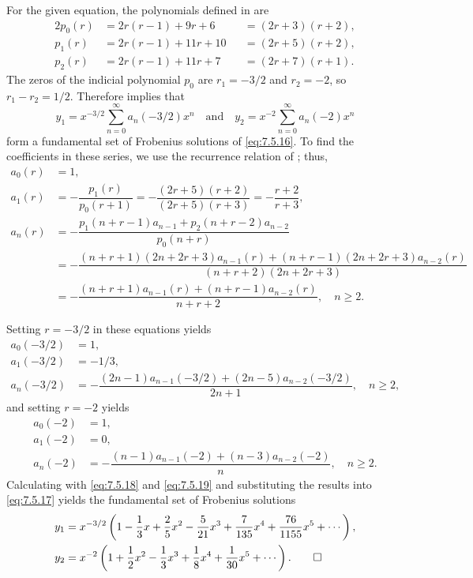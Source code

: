 \begin{solution}
For  the given equation, the polynomials defined in
 are
\begin{alignat*}{2}
p_0(r)&=2r(r-1)+9r+6&&=(2r+3)(r+2),\\
p_1(r)&=2r(r-1)+11r+10&&=(2r+5)(r+2),\\
p_2(r)&=2r(r-1)+11r+7&&=(2r+7)(r+1).
\end{alignat*}
The zeros of the indicial polynomial $p_0$ are $r_1=-3/2$
and $r_2=-2$, so  $r_1-r_2=1/2$. Therefore
 implies that
\begin{equation} \label{eq:7.5.17}
y_1=x^{-3/2}\sum_{n=0}^\infty a_n(-3/2)x^n\quad\text{and}\quad
y_2=x^{-2}\sum_{n=0}^\infty a_n(-2)x^n
\end{equation}
form a fundamental set of Frobenius
solutions
of \eqref{eq:7.5.16}.
To find the coefficients in these series, we use the recurrence
relation of ;   thus,
\begin{align*}
a_0(r)&=1,\\
a_1(r)&=-\dfrac{p_1(r)}{p_0(r+1)}
=-\dfrac{(2r+5)(r+2)}{(2r+5)(r+3)}
=-\dfrac{r+2}{r+3},\\
a_n(r)&=-\dfrac{p_1(n+r-1)a_{n-1}+p_2(n+r-2)a_{n-2}}{p_0(n+r)}\\
&=-\dfrac{(n+r+1)(2n+2r+3)a_{n-1}(r)
+(n+r-1)(2n+2r+3)a_{n-2}(r)}{(n+r+2)(2n+2r+3)}\\
&=-\dfrac{(n+r+1)a_{n-1}(r)+(n+r-1)a_{n-2}(r)}{n+r+2},\quad n\ge2.
\end{align*}

Setting $r=-3/2$ in these equations yields
\begin{equation} \label{eq:7.5.18}
\begin{aligned}
a_0(-3/2)&=1,\\
a_1(-3/2)&=-1/3,\\
a_n(-3/2)&=-\dfrac{(2n-1)a_{n-1}(-3/2)+
(2n-5)a_{n-2}(-3/2)}{2n+1},\quad n\ge2,
\end{aligned}
\end{equation}
and setting $r=-2$ yields
\begin{equation} \label{eq:7.5.19}
\begin{aligned}
a_0(-2)&=1,\\
a_1(-2)&=0,\\
a_n(-2)&=-\dfrac{(n-1)a_{n-1}(-2)+(n-3)a_{n-2}(-2)}{n},\quad n\ge2.
\end{aligned}
\end{equation}
Calculating with \eqref{eq:7.5.18} and
\eqref{eq:7.5.19} and substituting the results into
\eqref{eq:7.5.17} yields the fundamental set of Frobenius solutions
\begin{align*}
y_1&=x^{-3/2}\left(1-\frac{1}{3}x+\frac{2}{5}x^2-\frac{5}{21}x^3
+\frac{7}{135}x^4+\frac{76}{1155}x^5+\cdots\right),\\
y_2&=x^{-2}\left(1+\frac{1}{2}x^2-\frac{1}{3}x^3+\frac{1}{8}x^4+\frac{1}{30}x^5
+\cdots\right).\qedhere
\end{align*}
\end{solution}


